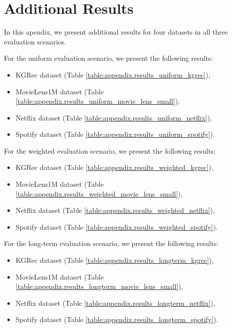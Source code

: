 \chapter{Additional Results} \label{apendix:additional_results}

In this apendix, we present additional results for four datasets in all three evaluation scenarios.

For the uniform evaluation scenario, we present the following results:
\begin{itemize}
    \item KGRec dataset (Table \ref{table:appendix.results_uniform_kgrec}), 
    \item MovieLens1M dataset (Table \ref{table:appendix.results_uniform_movie_lens_small}), 
    \item Netflix dataset (Table \ref{table:appendix.results_uniform_netflix}), 
    \item Spotify dataset (Table \ref{table:appendix.results_uniform_spotify}).
\end{itemize}

For the weighted evaluation scenario, we present the following results:
\begin{itemize}
    \item KGRec dataset (Table \ref{table:appendix.results_weighted_kgrec}), 
    \item MovieLens1M dataset (Table \ref{table:appendix.results_weighted_movie_lens_small}), 
    \item Netflix dataset (Table \ref{table:appendix.results_weighted_netflix}), 
    \item Spotify dataset (Table \ref{table:appendix.results_weighted_spotify}).
\end{itemize}


For the long-term evaluation scenario, we present the following results:
\begin{itemize}
    \item KGRec dataset (Table \ref{table:appendix.results_longterm_kgrec}), 
    \item MovieLens1M dataset (Table \ref{table:appendix.results_longterm_movie_lens_small}), 
    \item Netflix dataset (Table \ref{table:appendix.results_longterm_netflix}), 
    \item Spotify dataset (Table \ref{table:appendix.results_longterm_spotify}).
\end{itemize}



